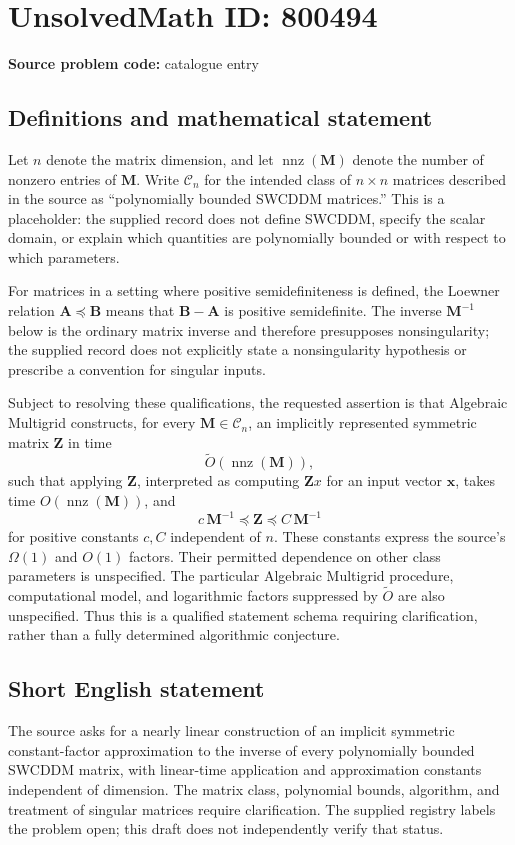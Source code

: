 \documentclass[11pt]{article}
\begin{document}
\section*{UnsolvedMath ID: 800494}
\textbf{Source problem code:} catalogue entry
\subsection{Definitions and mathematical statement}
Let \(n\) denote the matrix dimension, and let \(\operatorname{nnz}(\mathbf M)\) denote the number of nonzero entries of \(\mathbf M\). Write \(\mathcal C_n\) for the intended class of \(n\times n\) matrices described in the source as ``polynomially bounded SWCDDM matrices.'' This is a placeholder: the supplied record does not define SWCDDM, specify the scalar domain, or explain which quantities are polynomially bounded or with respect to which parameters.

For matrices in a setting where positive semidefiniteness is defined, the Loewner relation \(\mathbf A\preceq\mathbf B\) means that \(\mathbf B-\mathbf A\) is positive semidefinite. The inverse \(\mathbf M^{-1}\) below is the ordinary matrix inverse and therefore presupposes nonsingularity; the supplied record does not explicitly state a nonsingularity hypothesis or prescribe a convention for singular inputs.

Subject to resolving these qualifications, the requested assertion is that Algebraic Multigrid constructs, for every \(\mathbf M\in\mathcal C_n\), an implicitly represented symmetric matrix \(\mathbf Z\) in time
\[
\widetilde O\!\left(\operatorname{nnz}(\mathbf M)\right),
\]
such that applying \(\mathbf Z\), interpreted as computing \(\mathbf Zx\) for an input vector \(\mathbf x\), takes time \(O(\operatorname{nnz}(\mathbf M))\), and
\[
c\,\mathbf M^{-1}\preceq\mathbf Z\preceq C\,\mathbf M^{-1}
\]
for positive constants \(c,C\) independent of \(n\). These constants express the source's \(\Omega(1)\) and \(O(1)\) factors. Their permitted dependence on other class parameters is unspecified. The particular Algebraic Multigrid procedure, computational model, and logarithmic factors suppressed by \(\widetilde O\) are also unspecified. Thus this is a qualified statement schema requiring clarification, rather than a fully determined algorithmic conjecture.
\subsection{Short English statement}
The source asks for a nearly linear construction of an implicit symmetric constant-factor approximation to the inverse of every polynomially bounded SWCDDM matrix, with linear-time application and approximation constants independent of dimension. The matrix class, polynomial bounds, algorithm, and treatment of singular matrices require clarification. The supplied registry labels the problem open; this draft does not independently verify that status.
\end{document}
